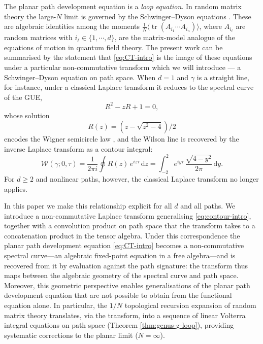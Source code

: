 \documentclass[11pt,a4paper]{article}
\DeclareMathOperator{\tr}{tr}
\newcommand{\cW}{\mathcal{W}}
\newcommand{\dd}{\mathrm{d}}
\begin{document}
The planar path development equation is a \emph{loop equation}. In random matrix theory the large-$N$ limit is governed by the Schwinger--Dyson equations \cite{migdal1983loop,eynard2016counting,anderson2010introduction}. These are algebraic identities among the moments $\frac{1}{N}\langle\tr(A_{i_1}\cdots A_{i_n})\rangle$, where $A_{i_\ell}$ are random matrices with $i_\ell\in\{1,\cdots,d\}$, are the matrix-model analogue of the equations of motion in quantum field theory. The present work can be summarised by the statement that \eqref{eq:CT-intro} is the image of these equations under a particular non-commutative transform which we will introduce --- a Schwinger--Dyson equation on path space. When $d=1$ and $\gamma$ is a straight line, for instance, under a classical Laplace transform it reduces to the spectral curve of the GUE,
\begin{equation}\label{eq:semicircle-res-eq}
    R^2-zR+1=0,
\end{equation}
whose solution
%
\begin{equation}\label{eq:Gaussian-spectral-curve}
R(z)=(z-\sqrt{z^2-4})/2
\end{equation}
%
encodes the Wigner semicircle law \cite{wigner1993characteristic,anderson2010introduction}, and the Wilson line is recovered by the inverse Laplace transform as a contour integral:
\begin{equation}\label{eq:contour-intro}
  \cW(\gamma;0,\tau) = \frac{1}{2\pi i}\oint R(z)\,
 e^{iz\tau}\,\dd z = \int_{-2}^{2}e^{i y \tau}\, \frac{\sqrt{4-y^2}}{2\pi}\,\dd y.
\end{equation}
For $d\geq2$ and nonlinear paths, however, the classical Laplace transform no longer applies.

In this paper we make this relationship explicit for all $d$ and all paths. We introduce a non-commutative Laplace transform generalising \eqref{eq:contour-intro}, together with a convolution product on path space that the transform takes to a concatenation product in the tensor algebra. Under this correspondence the planar path development equation \eqref{eq:CT-intro} becomes a non-commutative spectral curve---an algebraic fixed-point equation in a free algebra---and is recovered from it by evaluation against the path signature: the transform thus maps between the algebraic geometry of the spectral curve and path space. Moreover, this geometric perspective enables generalisations of the planar path development equation that are not possible to obtain from the functional equation alone. In particular, the $1/N$ topological recursion expansion of random matrix theory translates, via the transform, into a sequence of linear Volterra integral equations on path space (Theorem \ref{thm:genus-g-loop}), providing systematic corrections to the planar limit ($N=\infty$). 
\end{document}
